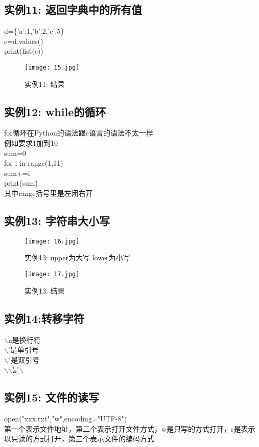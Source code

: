 \documentclass[a4paper, 12pt]{article}
\begin{document}
        \subsection{实例11: 返回字典中的所有值}
        \noindent d=\{'a':1,'b':2,'c':5\}\\
        c=d.values()\\
        print(list(c))
        \begin{figure}[h!]
          \centering
          \texttt{[image: 15.jpg]}
          \caption{实例11: 结果 }
        \end{figure}
        \subsection{实例12: while的循环}
        \noindent for循环在Python的语法跟c语言的语法不太一样\\
        例如要求1加到10\\
        sum=0\\
        for i in range(1,11)\\
        sum+=i\\
        print(sum)\\
        其中range括号里是左闭右开
        \newpage
        \subsection{实例13: 字符串大小写}
        \begin{figure}[h!]
          \centering
          \texttt{[image: 16.jpg]}
          \caption{实例13: upper为大写 lower为小写 }
        \end{figure}
        \begin{figure}[h!]
          \centering
          \texttt{[image: 17.jpg]}
          \caption{实例13: 结果}
        \end{figure}
        \subsection{实例14:转移字符}
        \noindent $\backslash$n是换行符\\
        $\backslash$'是单引号\\
        $\backslash$"是双引号\\
        $\backslash$$\backslash$是$\backslash$
        \subsection{实例15: 文件的读写}
        \noindent open("xxx.txt","w",encoding="UTF-8")\\
        第一个表示文件地址，第二个表示打开文件方式，w是只写的方式打开，r是表示以只读的方式打开，第三个表示文件的编码方式
\end{document}
